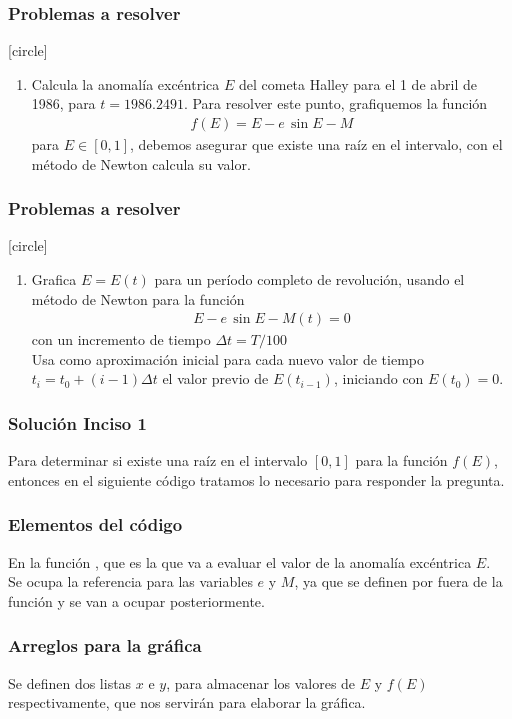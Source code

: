 \begin{frame}
\frametitle{Problemas a resolver}
[circle]
\begin{enumerate}[<+->]
\item Calcula la anomalía excéntrica $E$ del cometa Halley para el 1 de abril de 1986, para $t = 1986.2491$.
Para resolver este punto, grafiquemos la función
\begin{align}
f(E) = E - e \, \sin E - M
\label{eq_ecuacion_6_60}
\end{align}
para $E \in [0,1]$, debemos asegurar que existe una raíz en el intervalo, con el método de Newton calcula su valor.
\seti
\end{enumerate}
\end{frame}
\begin{frame}
\frametitle{Problemas a resolver}
[circle]
\begin{enumerate}[<+->]
\conti
\item Grafica $E = E(t)$ para un período completo de revolución, usando el método de Newton para la función
\begin{align}
E -  e \, \sin E - M(t) = 0
\label{eq:ecuacion_6_61}
\end{align}
con un incremento de tiempo $\Delta t = T / 100$
\\
\bigskip
Usa como aproximación inicial para cada nuevo valor de tiempo $t_{i} = t_{0} + (i-1) \Delta t$ el valor previo de $E(t_{i-1})$, iniciando con $E(t_{0}) = 0$.
\end{enumerate}
\end{frame}
\begin{frame}
\frametitle{Solución Inciso 1}
Para determinar si existe una raíz en el intervalo $[0, 1]$ para la función $f(E)$, entonces en el siguiente código tratamos lo necesario para responder la pregunta.
\end{frame}
\begin{frame}
\frametitle{Elementos del código}
En la función , que es la que va a evaluar el valor de la anomalía excéntrica $E$.
\\
\bigskip
Se ocupa la referencia  para las variables $e$ y $M$, ya que se definen por fuera de la función y se van a ocupar posteriormente.
\end{frame}
\begin{frame}
\frametitle{Arreglos para la gráfica}
Se definen dos listas $x$ e $y$, para almacenar los valores de $E$ y $f(E)$ respectivamente, que nos servirán para elaborar la gráfica.
\end{frame}
